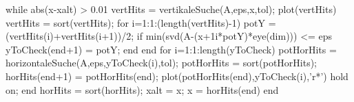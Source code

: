 
while abs(x-xalt) > 0.01
    vertHits = vertikaleSuche(A,eps,x,tol);
    plot(vertHits)
    vertHits = sort(vertHits);
    for i=1:1:(length(vertHits)-1)
        potY =  (vertHits(i)+vertHits(i+1))/2;
        if min(svd(A-(x+1i*potY)*eye(dim))) <= eps
            yToCheck(end+1) = potY;
        end
    end
    for i=1:1:length(yToCheck)
        potHorHits = horizontaleSuche(A,eps,yToCheck(i),tol); 
        potHorHits = sort(potHorHits);
        horHits(end+1) = potHorHits(end);
        plot(potHorHits(end),yToCheck(i),'r*')
        hold on;
    end
    horHits = sort(horHits);
    xalt = x;
    x = horHits(end)
end
